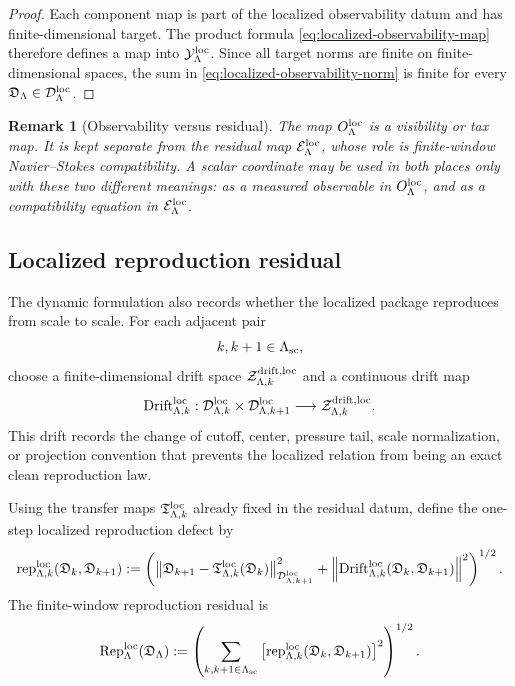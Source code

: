\documentclass[11pt]{article}
\numberwithin{equation}{section}
\newtheorem{remark}[theorem]{Remark}
\begin{document}
\begin{proof}
Each component map is part of the localized observability datum and has
finite-dimensional target.  The product formula
\eqref{eq:localized-observability-map} therefore defines a map into
\(\mathcal Y_\Lambda^{\rm loc}\).  Since all target norms are finite on
finite-dimensional spaces, the sum in
\eqref{eq:localized-observability-norm} is finite for every
\(\mathfrak D_\Lambda\in\mathcal D_\Lambda^{\rm loc}\).
\end{proof}

\begin{remark}[Observability versus residual]
The map \(O_\Lambda^{\rm loc}\) is a visibility or tax map.  It is kept
separate from the residual map \(\mathcal E_\Lambda^{\rm loc}\), whose role
is finite-window Navier--Stokes compatibility.  A scalar coordinate may be
used in both places only with these two different meanings: as a measured
observable in \(O_\Lambda^{\rm loc}\), and as a compatibility equation in
\(\mathcal E_\Lambda^{\rm loc}\).
\end{remark}

\subsection{Localized reproduction residual}\label{subsec:localized-reproduction-residual}

The dynamic formulation also records whether the localized package
reproduces from scale to scale.  For each adjacent pair
\[
        k,k+1\in\Lambda_{\rm sc},
\]
choose a finite-dimensional drift space
\(\mathcal Z_{\Lambda,k}^{\rm drift,loc}\) and a continuous drift map
\[
        \operatorname{Drift}_{\Lambda,k}^{\rm loc}:
        \mathcal D_{\Lambda,k}^{\rm loc}
        \times
        \mathcal D_{\Lambda,k+1}^{\rm loc}
        \longrightarrow
        \mathcal Z_{\Lambda,k}^{\rm drift,loc}.
\]
This drift records the change of cutoff, center, pressure tail, scale
normalization, or projection convention that prevents the localized
relation from being an exact clean reproduction law.

Using the transfer maps \(\mathfrak T_{\Lambda,k}^{\rm loc}\) already fixed
in the residual datum, define the one-step localized reproduction defect by
\[
        \operatorname{rep}_{\Lambda,k}^{\rm loc}
        (\mathfrak D_k,\mathfrak D_{k+1})
        :=
        \left(
        \left\|
        \mathfrak D_{k+1}
        -
        \mathfrak T_{\Lambda,k}^{\rm loc}(\mathfrak D_k)
        \right\|_{\mathcal D_{\Lambda,k+1}^{\rm loc}}^2
        +
        \left\|
        \operatorname{Drift}_{\Lambda,k}^{\rm loc}
        (\mathfrak D_k,\mathfrak D_{k+1})
        \right\|^2
        \right)^{1/2}.
\]
The finite-window reproduction residual is
\begin{equation}\label{eq:localized-reproduction-residual}
        \operatorname{Rep}_\Lambda^{\rm loc}
        (\mathfrak D_\Lambda)
        :=
        \left(
        \sum_{\substack{k,k+1\in\Lambda_{\rm sc}}}
        \left[
        \operatorname{rep}_{\Lambda,k}^{\rm loc}
        (\mathfrak D_k,\mathfrak D_{k+1})
        \right]^2
        \right)^{1/2}.
\end{equation}
\end{document}
